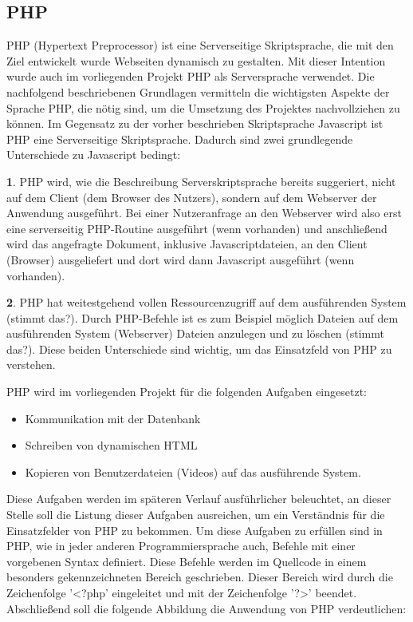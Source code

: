 \subsection{PHP}
\label{sec:Php}

PHP (Hypertext Preprocessor) ist eine Serverseitige Skriptsprache, die mit den Ziel entwickelt wurde Webseiten dynamisch
zu gestalten.
Mit dieser Intention wurde auch im vorliegenden Projekt PHP als Serversprache verwendet. Die nachfolgend beschriebenen
Grundlagen vermitteln die wichtigsten Aspekte der Sprache PHP, die nötig sind, um die Umsetzung des Projektes
nachvollziehen zu können.
Im Gegensatz zu der vorher beschrieben Skriptsprache Javascript ist PHP eine Serverseitige Skriptsprache. Dadurch sind
zwei grundlegende Unterschiede zu Javascript bedingt:

\textbf{1}. PHP wird, wie die Beschreibung Serverskriptsprache bereits suggeriert, nicht auf dem Client (dem Browser des Nutzers),
sondern auf dem Webserver der Anwendung ausgeführt. Bei einer Nutzeranfrage an den Webserver wird also erst eine
serverseitig PHP-Routine ausgeführt (wenn vorhanden) und anschließend wird das angefragte Dokument, inklusive
Javascriptdateien, an den Client (Browser) ausgeliefert und dort wird dann Javascript ausgeführt (wenn vorhanden).

\textbf{2}. PHP hat weitestgehend vollen Ressourcenzugriff auf dem ausführenden System (stimmt das?). Durch PHP-Befehle ist es zum
Beispiel möglich Dateien auf dem ausführenden System (Webserver) Dateien anzulegen und zu löschen (stimmt das?).
Diese beiden Unterschiede sind wichtig, um das Einsatzfeld von PHP zu verstehen.

PHP wird im vorliegenden Projekt für die folgenden Aufgaben eingesetzt:
\begin{itemize}
  \item Kommunikation mit der Datenbank
  \item Schreiben von dynamischen HTML
  \item Kopieren von Benutzerdateien (Videos) auf das ausführende System.
\end{itemize}

Diese Aufgaben werden im späteren Verlauf ausführlicher beleuchtet, an dieser Stelle soll die Listung dieser Aufgaben
ausreichen, um ein Verständnis für die Einsatzfelder von PHP zu bekommen.
Um diese Aufgaben zu erfüllen sind in PHP, wie in jeder anderen Programmiersprache auch, Befehle mit einer vorgebenen
Syntax definiert. Diese Befehle werden im Quellcode in einem besonders gekennzeichneten Bereich geschrieben. Dieser
Bereich wird durch die Zeichenfolge '<?php' eingeleitet und mit der Zeichenfolge '?>' beendet.
Abschließend soll die folgende Abbildung die Anwendung von PHP verdeutlichen:


